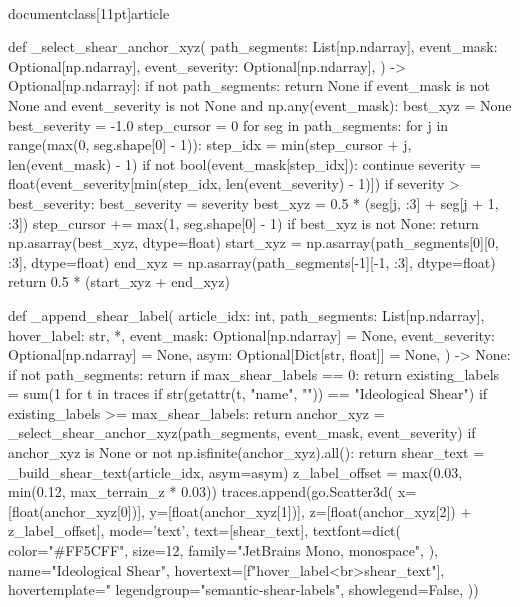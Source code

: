 \\documentclass[11pt]{article}
\begin{document}
\begin{CodeBlock}
{{    def _select_shear_anchor_xyz(
        path_segments: List[np.ndarray],
        event_mask: Optional[np.ndarray],
        event_severity: Optional[np.ndarray],
    ) -> Optional[np.ndarray]:
        if not path_segments:
            return None
        if event_mask is not None and event_severity is not None and np.any(event_mask):
            best_xyz = None
            best_severity = -1.0
            step_cursor = 0
            for seg in path_segments:
                for j in range(max(0, seg.shape[0] - 1)):
                    step_idx = min(step_cursor + j, len(event_mask) - 1)
                    if not bool(event_mask[step_idx]):
                        continue
                    severity = float(event_severity[min(step_idx, len(event_severity) - 1)])
                    if severity > best_severity:
                        best_severity = severity
                        best_xyz = 0.5 * (seg[j, :3] + seg[j + 1, :3])
                step_cursor += max(1, seg.shape[0] - 1)
            if best_xyz is not None:
                return np.asarray(best_xyz, dtype=float)
        start_xyz = np.asarray(path_segments[0][0, :3], dtype=float)
        end_xyz = np.asarray(path_segments[-1][-1, :3], dtype=float)
        return 0.5 * (start_xyz + end_xyz)

    def _append_shear_label(
        article_idx: int,
        path_segments: List[np.ndarray],
        hover_label: str,
        *,
        event_mask: Optional[np.ndarray] = None,
        event_severity: Optional[np.ndarray] = None,
        asym: Optional[Dict[str, float]] = None,
    ) -> None:
        if not path_segments:
            return
        if max_shear_labels == 0:
            return
        existing_labels = sum(1 for t in traces if str(getattr(t, "name", "")) == "Ideological Shear")
        if existing_labels >= max_shear_labels:
            return
        anchor_xyz = _select_shear_anchor_xyz(path_segments, event_mask, event_severity)
        if anchor_xyz is None or not np.isfinite(anchor_xyz).all():
            return
        shear_text = _build_shear_text(article_idx, asym=asym)
        z_label_offset = max(0.03, min(0.12, max_terrain_z * 0.03))
        traces.append(go.Scatter3d(
            x=[float(anchor_xyz[0])],
            y=[float(anchor_xyz[1])],
            z=[float(anchor_xyz[2]) + z_label_offset],
            mode='text',
            text=[shear_text],
            textfont=dict(
                color="#FF5CFF",
                size=12,
                family="JetBrains Mono, monospace",
            ),
            name="Ideological Shear",
            hovertext=[f"{hover_label}<br>{shear_text}"],
            hovertemplate="%
            legendgroup="semantic-shear-labels",
            showlegend=False,
        ))

}}
\end{CodeBlock}
\end{document}
